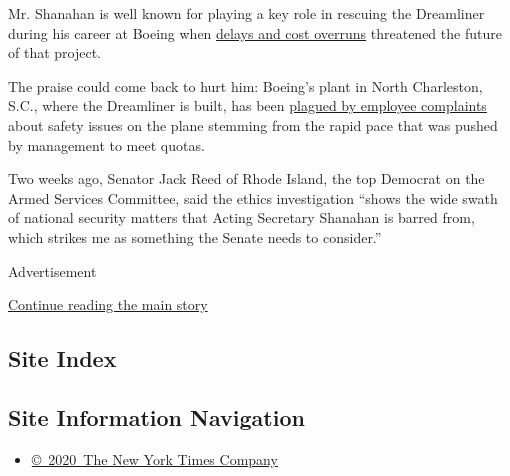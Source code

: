 Mr. Shanahan is well known for playing a key role in rescuing the
Dreamliner during his career at Boeing when
\href{https://www.nytimes.com/2017/04/01/business/patrick-shanahan-pentagon-nominee.html?module=inline}{delays
and cost overruns} threatened the future of that project.

The praise could come back to hurt him: Boeing's plant in North
Charleston, S.C., where the Dreamliner is built, has been
\href{https://www.nytimes.com/2019/04/20/business/boeing-dreamliner-production-problems.html?module=inline}{plagued
by employee complaints} about safety issues on the plane stemming from
the rapid pace that was pushed by management to meet quotas.

Two weeks ago, Senator Jack Reed of Rhode Island, the top Democrat on
the Armed Services Committee, said the ethics investigation ``shows the
wide swath of national security matters that Acting Secretary Shanahan
is barred from, which strikes me as something the Senate needs to
consider.''

Advertisement

\protect\hyperlink{after-bottom}{Continue reading the main story}

\hypertarget{site-index}{%
\subsection{Site Index}\label{site-index}}

\hypertarget{site-information-navigation}{%
\subsection{Site Information
Navigation}\label{site-information-navigation}}

\begin{itemize}
\tightlist
\item
  \href{https://help.nytimes.com/hc/en-us/articles/115014792127-Copyright-notice}{©~2020~The
  New York Times Company}
\end{itemize}

